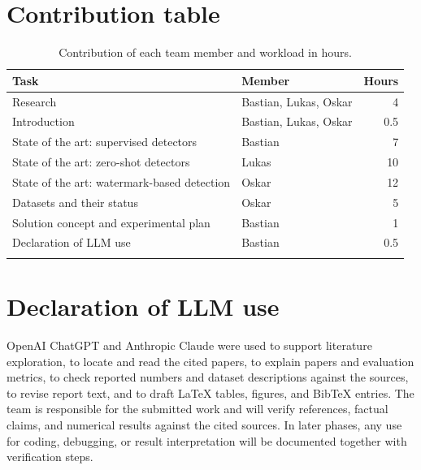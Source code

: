 \documentclass[11pt]{article}
\begin{document}
\section{Contribution table}

\begin{table}[H]
  \centering
  \small
  \begin{tabularx}{\columnwidth}{
      >{\raggedright\arraybackslash}X
      >{\raggedright\arraybackslash}p{}
      r
  }
    \toprule
    Task & Member & Hours \\
    \midrule
    Research & Bastian, Lukas, Oskar & 4 \\
    Introduction &  Bastian, Lukas, Oskar & 0.5 \\
    State of the art: supervised detectors & Bastian & 7 \\
    State of the art: zero-shot detectors & Lukas & 10 \\
    State of the art: watermark-based detection & Oskar & 12 \\
    Datasets and their status & Oskar & 5 \\
    Solution concept and experimental plan & Bastian & 1 \\
    Declaration of LLM use & Bastian & 0.5 \\
    \midrule
    \multicolumn{2}{l}{Total} & 40 \\
    \bottomrule
  \end{tabularx}
  \caption{Contribution of each team member and workload in hours.}
  \label{tab:contribution_table}
\end{table}

\section{Declaration of LLM use}
OpenAI ChatGPT and Anthropic Claude were used to support literature exploration, to locate and read the cited papers, to explain papers and evaluation metrics, to check reported numbers and dataset descriptions against the sources, to revise report text, and to draft LaTeX tables, figures, and BibTeX entries. The team is responsible for the submitted work and will verify references, factual claims, and numerical results against the cited sources. In later phases, any use for coding, debugging, or result interpretation will be documented together with verification steps.



\end{document}
